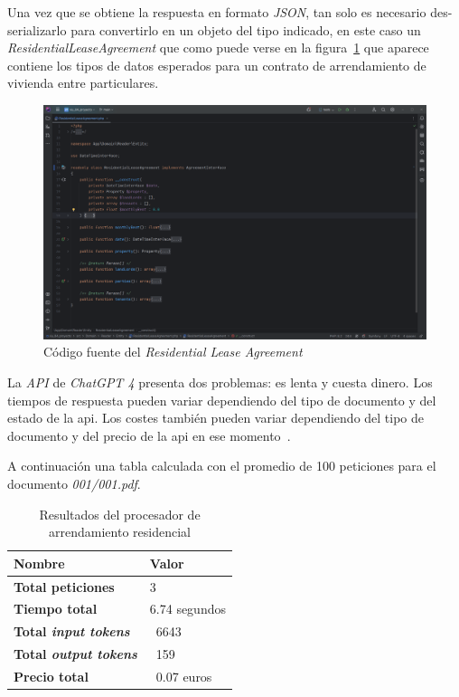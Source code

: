Una vez que se obtiene la respuesta en formato \textit{JSON}, tan solo es necesario des-serializarlo para convertirlo
en un objeto del tipo indicado, en este caso un \textit{ResidentialLeaseAgreement} que como puede verse en la
figura~\ref{fig:chapter_4.4.residential_agreement} que aparece contiene los tipos de datos esperados para un contrato de
arrendamiento de vivienda entre particulares.

\begin{figure}[ht]
    \begin{center}
        \includegraphics[width=\textwidth]{./chapter/4/images/chapter_4.4.residential_lease_agreement}
        \caption{Código fuente del \textit{Residential Lease Agreement}}
        \label{fig:chapter_4.4.residential_agreement}
    \end{center}
\end{figure}

La \textit{API} de \textit{ChatGPT 4} presenta dos problemas: es lenta y cuesta dinero.
Los tiempos de respuesta pueden variar dependiendo del tipo de documento y del estado de la api.
Los costes también pueden variar dependiendo del tipo de documento y del precio de la api en ese
momento~\cite{https://openai.com/api/pricing/}.

A continuación una tabla calculada con el promedio de 100 peticiones para el documento \textit{001/001.pdf}.

\begin{table}[h]
    \renewcommand{\arraystretch}{1.5}
    \setlength{\tabcolsep}{10pt}
    \begin{tabular}{>{\bfseries}p{} p{}}
        \toprule
        \textbf{Nombre}              & \textbf{Valor} \\
        \midrule
        Total peticiones             & 3              \\
        Tiempo total                 & 6.74 segundos  \\
        Total \textit{input tokens}  & ~6643          \\
        Total \textit{output tokens} & ~159           \\
        Precio total                 & ~0.07 euros    \\
        \bottomrule
    \end{tabular}
    \caption{Resultados del procesador de arrendamiento residencial}
    \label{tab:residential_lease_processor}
\end{table}

